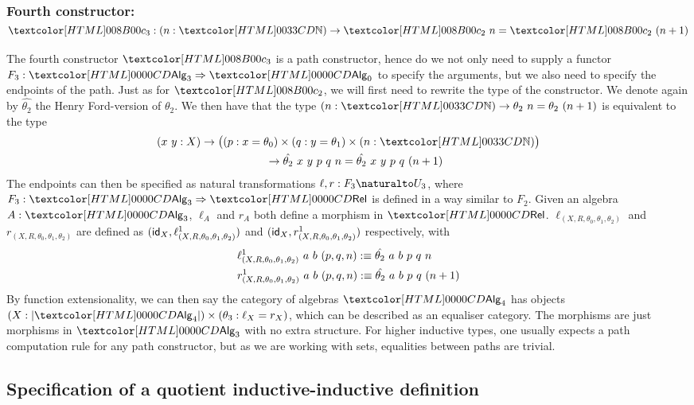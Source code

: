 \subsubsection{Fourth constructor: $\Bciii : (n : \natty) \to \Bcii\ n = \Bcii\ (n+1)$}

The fourth constructor $\Bciii$ is a path constructor, hence do we not
only need to supply a functor $F_3 : \Func{\Alg_3}{\Alg_0}$ to specify
the arguments, but we also need to specify the endpoints of the
path. Just as for $\Bcii$, we will first need to rewrite the type of
the constructor. We denote again by $\hat{\theta_2}$ the Henry
Ford-version of $\theta_2$.  We then have that the type
$(n : \natty) \to \theta_2\ n = \theta_2\ (n+ 1)$ is equivalent to the
type
%
\begin{multline*}
(x\ y : X) \to \big((p : x =  \theta_0) \times (q : y = \theta_1) \times (n : \natty)\big) \\
\ \ \ \ \to \hat{\theta_2}\ x\ y\ p\ q\ n = \hat{\theta_2}\ x\ y\ p\ q\ (n+1)
\end{multline*}
%
The endpoints can then be specified as natural transformations
$\ell, r : \Nat{F_3}{U_3}$, where $F_3 : \Func{\Alg_3}{\Rel}$ is defined in a
way similar to $F_2$. Given an algebra $A : \Alg_3$, $\ell_A$ and $r_A$
both define a morphism in
$\Rel$. $\ell_{(X,R,\theta_0,\theta_1,\theta_2)}$ and
$r_{(X,R,\theta_0,\theta_1,\theta_2)}$ are defined as
$(\id_X, \ell^1_{(X,R,\theta_0,\theta_1,\theta_2)})$ and
$(\id_X,r^1_{(X,R,\theta_0,\theta_1,\theta_2)})$ respectively, with
%
\begin{align*}
&\ell^1_{(X,R,\theta_0,\theta_1,\theta_2)}\ a\ b\ (p, q, n) :\equiv \hat{\theta_2}\ a\ b\ p\ q\ n \\
&r^1_{(X,R,\theta_0,\theta_1,\theta_2)}\ a\ b\ (p, q, n) :\equiv \hat{\theta_2}\ a\ b\ p\ q\ (n+1)
\end{align*}
%
By function extensionality, we can then say the category of algebras
$\Alg_4$ has objects
$(X : | \Alg_4 |) \times (\theta_3 : \ell_X = r_X)$, which can be
described as an equaliser category. The morphisms are just morphisms
in $\Alg_3$ with no extra structure. For higher inductive types, one
usually expects a path computation rule for any path constructor, but
as we are working with sets, equalities between paths are trivial.

\subsection{Specification of a quotient inductive-inductive definition}

